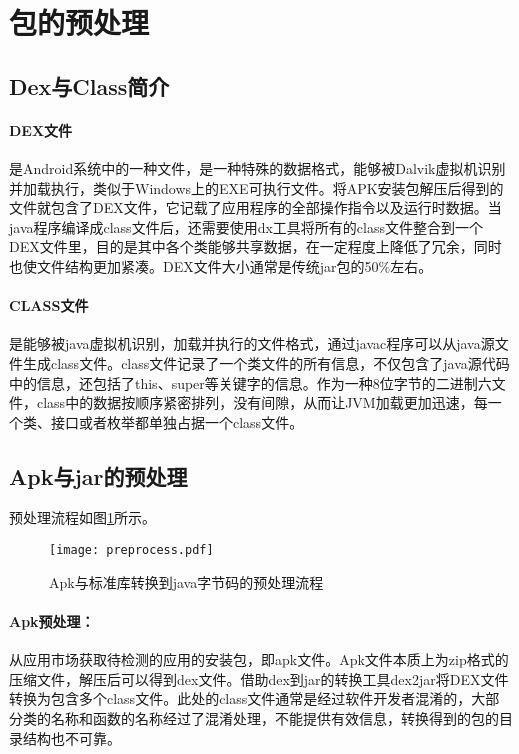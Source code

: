 \section{包的预处理}


\subsection{Dex与Class简介}

\paragraph{DEX文件}是Android系统中的一种文件，是一种特殊的数据格式，能够被Dalvik虚拟机识别并加载执行，类似于Windows上的EXE可执行文件。将APK安装包解压后得到的文件就包含了DEX文件，它记载了应用程序的全部操作指令以及运行时数据。当java程序编译成class文件后，还需要使用dx工具将所有的class文件整合到一个DEX文件里，目的是其中各个类能够共享数据，在一定程度上降低了冗余，同时也使文件结构更加紧凑。DEX文件大小通常是传统jar包的50\%左右。


\paragraph{CLASS文件}是能够被java虚拟机识别，加载并执行的文件格式，通过javac程序可以从java源文件生成class文件。class文件记录了一个类文件的所有信息，不仅包含了java源代码中的信息，还包括了this、super等关键字的信息。作为一种8位字节的二进制六文件，class中的数据按顺序紧密排列，没有间隙，从而让JVM加载更加迅速，每一个类、接口或者枚举都单独占据一个class文件。


\subsection{Apk与jar的预处理}

预处理流程如图\ref{fig:preprocess}所示。
\begin{figure}[!htp]
  \centering
  \texttt{[image: preprocess.pdf]} \\
  \caption{Apk与标准库转换到java字节码的预处理流程}
 \label{fig:preprocess}
\end{figure}

\paragraph{Apk预处理：}从应用市场获取待检测的应用的安装包，即apk文件。Apk文件本质上为zip格式的压缩文件，解压后可以得到dex文件。借助dex到jar的转换工具dex2jar\cite{d2j}将DEX文件转换为包含多个class文件。此处的class文件通常是经过软件开发者混淆的，大部分类的名称和函数的名称经过了混淆处理，不能提供有效信息，转换得到的包的目录结构也不可靠。


